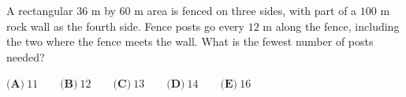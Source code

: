 A rectangular $36$ m by $60$ m area is fenced on three sides, with part of a $100$ m rock wall as the fourth side. Fence posts go every $12$ m along the fence, including the two where the fence meets the wall. What is the fewest number of posts needed?

$\textbf{(A)}\ 11\qquad\textbf{(B)}\ 12\qquad\textbf{(C)}\ 13\qquad\textbf{(D)}\ 14\qquad\textbf{(E)}\ 16$
